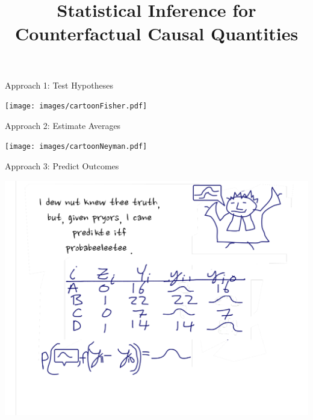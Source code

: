 

%

%





\title[Recap/Overview]{Statistical Inference for Counterfactual Causal Quantities}







\begin{frame}{Approach 1: Test Hypotheses}


  \smallskip
  \centering
  \texttt{[image: images/cartoonFisher.pdf]}


\end{frame}


\begin{frame}{Approach 2: Estimate Averages}

  \smallskip
  \centering
  \texttt{[image: images/cartoonNeyman.pdf]}


\end{frame}


\begin{frame}{Approach 3: Predict Outcomes}

  \smallskip
  \centering
  \includegraphics[width=.9\textwidth]{images/cartoonBayes.pdf}


\end{frame}

